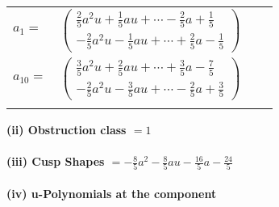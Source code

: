 \documentclass[1p]{elsarticle_modified}
\theoremstyle{definition}
\begin{document}
\begin{tabular}{m{7pt} m{180pt} m{7pt} m{180pt} }
\flushright $a_{1}=$&$\begin{pmatrix}\frac{2}{5} a^2 u+\frac{1}{5} a u+\cdots-\frac{2}{5} a+\frac{1}{5}\\-\frac{2}{5} a^2 u-\frac{1}{5} a u+\cdots+\frac{2}{5} a-\frac{1}{5}\end{pmatrix}$ \\
\flushright $a_{10}=$&$\begin{pmatrix}\frac{3}{5} a^2 u+\frac{2}{5} a u+\cdots+\frac{3}{5} a-\frac{7}{5}\\-\frac{2}{5} a^2 u-\frac{3}{5} a u+\cdots-\frac{2}{5} a+\frac{3}{5}\end{pmatrix}$\\&\end{tabular}
\flushleft \textbf{(ii) Obstruction class $= 1$}\\~\\
\flushleft \textbf{(iii) Cusp Shapes $= -\frac{8}{5} a^2-\frac{8}{5} a u-\frac{16}{5} a-\frac{24}{5}$}\\~\\
\newpage\renewcommand{\arraystretch}{1}
\flushleft \textbf{(iv) u-Polynomials at the component}\newline \\
\end{document}

